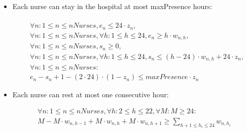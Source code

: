 \begin{itemize}
\item  Each nurse can stay in the hospital at most maxPresence hours: \\ \\
\begin{equation}
\begin{aligned}
&\forall n:  1 \leq n \leq nNurses, e_{n} \leq 24 \cdot z_{n}, \\
 &\forall n:  1 \leq n \leq nNurses, \forall h: 1 \leq h \leq 24, e_{n} \geq h \cdot w_{n,h}, \\ 
 &\forall n:  1 \leq n \leq nNurses, s_{n} \geq 0, \\
 &\forall n:  1 \leq n \leq nNurses, \forall h: 1 \leq h \leq 24, s_{n} \leq (h - 24) \cdot w_{n,h} + 24 \cdot z_{n}, \\
  &\forall n:  1 \leq n \leq nNurses: \\ &e_{n} - s_{n} + 1 - (2 \cdot 24)\cdot(1 - z_{n}) \leq maxPresence \cdot z_{n}
\end{aligned}
\end{equation}

\item  Each nurse can rest at most one consecutive hour:

\begin{equation}
\begin{aligned}
\forall n:  1 \leq n \leq nNurses, \forall h: 2 \leq h \leq 22, \forall M: M \geq 24:  \\ M - M \cdot w_{n,h-1} + M \cdot w_{n,h} + M \cdot w_{n,h+1}  \geq \sum\limits_{h+1 \leq h_{i} \leq 24 }  w_{n,h_{i}}
 \end{aligned}
\end{equation}

\end{itemize}

\pagebreak